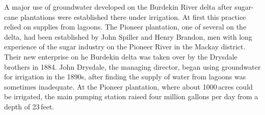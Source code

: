 A major use of groundwater developed on the Burdekin River
 delta after sugar-cane plantations were
established there under irrigation.  At first this practice relied on
supplies from lagoons.  The Pioneer plantation, one of several on the
delta, had been established by John Spiller and 
Henry Brandon,  men with long experience of the
sugar industry on the Pioneer River  in the
Mackay district.  Their new enterprise on he Burdekin delta was taken
over by the Drysdale brothers  in 1884.  John
Drysdale, the managing director, began using groundwater for
irrigation in the 1890s, after finding the supply of water from
lagoons was sometimes inadequate.  At the Pioneer plantation, where
about 1000\,acres could be irrigated, the main pumping station raised
four million gallons per day from a depth of
23\,feet.


